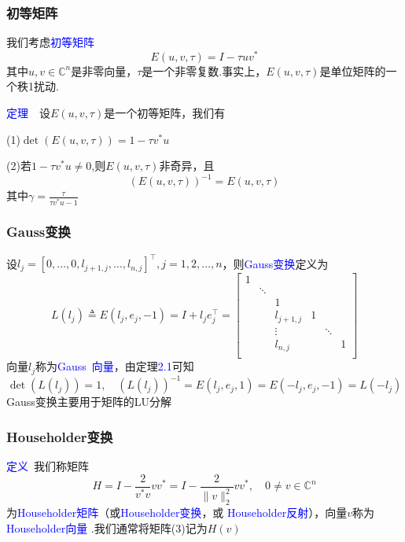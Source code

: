 \documentclass[12pt,a4paper]{article}
\begin{document}
\subsubsection{初等矩阵}
\noindent 我们考虑\textcolor{blue}{初等矩阵}$$E(u, v, \tau)=I-\tau u v^*$$
其中$u,v\in \mathbb{C}^n$是非零向量，$\tau$是一个非零复数.事实上，$E(u,v,\tau)$是单位矩阵的一个秩1扰动.

\noindent \textcolor{blue}{定理}~~设$E(u,v,\tau)$是一个初等矩阵，我们有

(1)$\operatorname{det}(E(u, v, \tau))=1-\tau v^{*} u$

(2)若$1-\tau v^* u \neq 0$,则$E(u,v,\tau)$非奇异，且
$$(E(u,v,\tau))^{-1}=E(u,v,\tau)$$
其中$\gamma=\frac{\tau}{\tau v^{*} u-1}$

\subsubsection{Gauss变换}
\noindent 设$l_{j}=\left[0, \ldots, 0, l_{j+1, j}, \ldots, l_{n,
	j}\right]^{\top}, j=1,2, \ldots, n$，则\textcolor{blue}{Gauss变换}定义为$$
L\left(l_{j}\right) \triangleq E\left(l_{j}, e_{j},-1\right)=I+l_{j}
e_{j}^{\top}=\begin{bmatrix}
1 &  &  &  &   &  \\
& \ddots &  &  &  & \\
& & 1 & & & \\
& & l_{j+1,j}& 1  & & \\
& & \vdots & & \ddots & \\
& & l_{n,j} & & & 1\\
\end{bmatrix}
$$
向量$l_j$称为\textcolor{blue}{Gauss~向量}，由定理\textcolor{blue}{2.1}可知$$
\operatorname{det}\left(L\left(l_{j}\right)\right)=1, \quad\left(L\left(l_{j}\right)\right)^{-1}=E\left(l_{j}, e_{j}, 1\right)=E\left(-l_{j}, e_{j},-1\right)=L\left(-l_{j}\right)
$$
Gauss变换主要用于矩阵的LU分解

\subsubsection{Householder变换}
\noindent \textcolor{blue}{定义}~我们称矩阵
\begin{equation}
H=I-\frac{2}{v^{*} v} v v^{*}=I-\frac{2}{\|v\|_{2}^{2}} v v^{*}, \quad 0 \neq v \in \mathbb{C}^{n}
\end{equation}
为\textcolor{blue}{Householder矩阵}（或\textcolor{blue}{Householder变换}，或
\textcolor{blue}{Householder反射}），向量$v$称为\textcolor{blue}{Householder向量
}.我们通常将矩阵(3)记为$H(v)$\\
\end{document}
